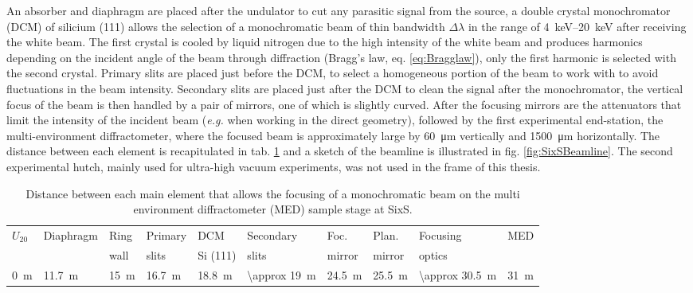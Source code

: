 An absorber and diaphragm are placed after the undulator to cut any parasitic signal from the source, a double crystal monochromator (DCM) of silicium (111) allows the selection of a monochromatic beam of thin bandwidth $\Delta \lambda$ in the range of \qtyrange{4}{20}{\keV} after receiving the white beam.
The first crystal is cooled by liquid nitrogen due to the high intensity of the white beam and produces harmonics depending on the incident angle of the beam through diffraction (Bragg's law, eq. \ref{eq:Bragglaw}), only the first harmonic is selected with the second crystal.
Primary slits are placed just before the DCM, to select a homogeneous portion of the beam to work with to avoid fluctuations in the beam intensity.
Secondary slits are placed just after the DCM to clean the signal after the monochromator, the vertical focus of the beam is then handled by a pair of mirrors, one of which is slightly curved.
After the focusing mirrors are the attenuators that limit the intensity of the incident beam (\textit{e.g.} when working in the direct geometry), followed by the first experimental end-station, the multi-environment diffractometer, where the focused beam is approximately large by \qty{60}{\um} vertically and \qty{1500}{\um} horizontally.
The distance between each element is recapitulated in tab. \ref{tab:DistanceSixS} and a sketch of the beamline is illustrated in fig. \ref{fig:SixSBeamline}.
The second experimental hutch, mainly used for ultra-high vacuum experiments, was not used in the frame of this thesis.

\begin{table}[!htb]
	\centering
    \small{
	\begin{tabular}{@{}llllllllll@{}}
	\toprule
	$U_{20}$ & Diaphragm & Ring    & Primary     & DCM         & Secondary       & Foc.      & Plan.     & Focusing &  MED \\
	         &           & wall    & slits       & Si (111)    & slits           & mirror    & mirror    & optics        &  \\
 	\midrule
 	\qty{0}{\m}&\qty{11.7}{\m}&\qty{15}{\m}&\qty{16.7}{\m}&\qty{18.8}{\m}&\qty{\approx 19}{\m}&\qty{24.5}{\m}&\qty{25.5}{\m}&\qty{\approx 30.5}{\m}&\qty{31}{\m}
	\end{tabular}
    }
	\caption{
		Distance between each main element that allows the focusing of a monochromatic beam on the multi environment diffractometer (MED) sample stage at SixS.
	}
    \label{tab:DistanceSixS}
\end{table}

